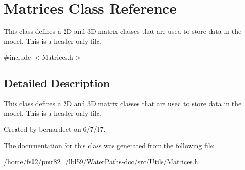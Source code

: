 \hypertarget{classMatrices}{}\section{Matrices Class Reference}
\label{classMatrices}


This class defines a 2D and 3D matrix classes that are used to store data in the model. This is a header-\/only file.  




{\ttfamily \#include $<$Matrices.\+h$>$}



\subsection{Detailed Description}
This class defines a 2D and 3D matrix classes that are used to store data in the model. This is a header-\/only file. 

Created by bernardoct on 6/7/17. 

The documentation for this class was generated from the following file\+:\begin{DoxyCompactItemize}
\item 
/home/fs02/pmr82\+\_/lbl59/\+Water\+Paths-\/doc/src/\+Utils/\mbox{\hyperlink{Matrices_8h}{Matrices.\+h}}\end{DoxyCompactItemize}
